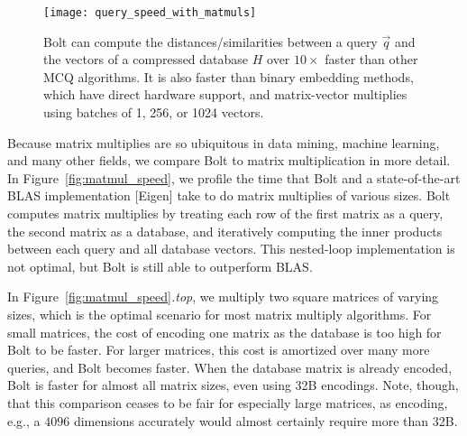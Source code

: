 

\begin{figure}[h]
\begin{center}
\label{fig:query_speeds}
\texttt{[image: query\_speed\_with\_matmuls]}
\caption{Bolt can compute the distances/similarities between a query $\vec{q}$ and the vectors of a compressed database $H$ over $10\times$ faster than other MCQ algorithms. It is also faster than binary embedding methods, which have direct hardware support, and matrix-vector multiplies using batches of 1, 256, or 1024 vectors.}
\end{center}
\end{figure}

Because matrix multiplies are so ubiquitous in data mining, machine learning, and many other fields, we compare Bolt to matrix multiplication in more detail. In Figure~\ref{fig:matmul_speed}, we profile the time that Bolt and a state-of-the-art BLAS implementation [Eigen] take to do matrix multiplies of various sizes. Bolt computes matrix multiplies by treating each row of the first matrix as a query, the second matrix as a database, and iteratively computing the inner products between each query and all database vectors. This nested-loop implementation is not optimal, but Bolt is still able to outperform BLAS.

In Figure~\ref{fig:matmul_speed}\textit{.top}, we multiply two square matrices of varying sizes, which is the optimal scenario for most matrix multiply algorithms. For small matrices, the cost of encoding one matrix as the database is too high for Bolt to be faster. For larger matrices, this cost is amortized over many more queries, and Bolt becomes faster. When the database matrix is already encoded, Bolt is faster for almost all matrix sizes, even using 32B encodings. Note, though, that this comparison ceases to be fair for especially large matrices, as encoding, e.g., a $4096$ dimensions accurately would almost certainly require more than 32B. %

